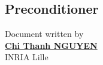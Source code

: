 \documentclass[a4paper,10pt]{article}
\begin{document}
\subsection{Preconditioner }



						      \begin{flushright}
						      Document written by \\
						      \href{mailto:chi-thanh.nguyen@inria.fr}{{\textbf {Chi Thanh NGUYEN}}} \\
						      INRIA Lille
						      \end{flushright}

%
%
\end{document}
